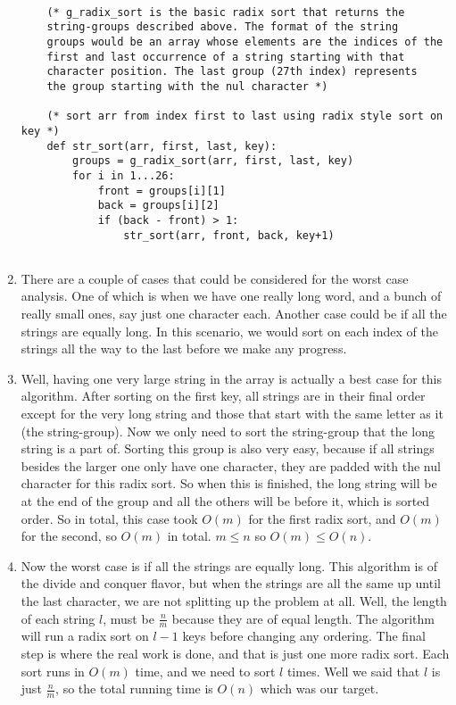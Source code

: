 \documentclass[a4paper,12pt]{article}
\begin{document}
\begin{enumerate}[]
  \begin{verbatim}

    (* g_radix_sort is the basic radix sort that returns the
    string-groups described above. The format of the string
    groups would be an array whose elements are the indices of the
    first and last occurrence of a string starting with that
    character position. The last group (27th index) represents
    the group starting with the nul character *)

    (* sort arr from index first to last using radix style sort on key *)
    def str_sort(arr, first, last, key):
        groups = g_radix_sort(arr, first, last, key)
        for i in 1...26:
            front = groups[i][1]
            back = groups[i][2]
            if (back - front) > 1:
                str_sort(arr, front, back, key+1)
            
  \end{verbatim}

\item There are a couple of cases that could be considered for the
  worst case analysis. One of which is when we have one really long
  word, and a bunch of really small ones, say just one character
  each. Another case could be if all the strings are equally long. In
  this scenario, we would sort on each index of the strings all the
  way to the last before we make any progress.

\item Well, having one very large string in the array is actually a
  best case for this algorithm. After sorting on the first key, all
  strings are in their final order except for the very long string and
  those that start with the same letter as it (the string-group). Now
  we only need to sort the string-group that the long string is a part
  of. Sorting this group is also very easy, because if all strings
  besides the larger one only have one character, they are padded with
  the nul character for this radix sort. So when this is finished, the
  long string will be at the end of the group and all the others will
  be before it, which is sorted order. So in total, this case took
  $O(m)$ for the first radix sort, and $O(m)$ for the second, so
  $O(m)$ in total. $m \le n$ so $O(m) \le O(n)$.

\item Now the worst case is if all the strings are equally long. This
  algorithm is of the divide and conquer flavor, but when the strings
  are all the same up until the last character, we are not splitting
  up the problem at all. Well, the length of each string $l$, must be
  $\frac{n}{m}$ because they are of equal length. The algorithm will
  run a radix sort on $l-1$ keys before changing any ordering. The
  final step is where the real work is done, and that is just one more
  radix sort. Each sort runs in $O(m)$ time, and we need to sort $l$
  times. Well we said that $l$ is just $\frac{n}{m}$, so the total
  running time is $O(n)$ which was our target. 

  
\end{enumerate}
\end{document}

